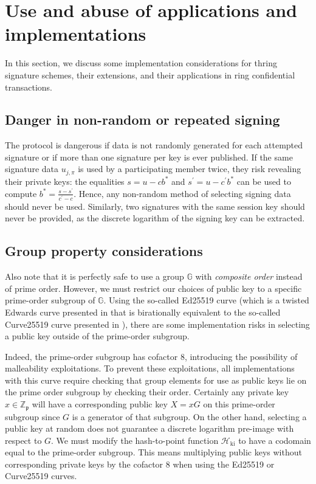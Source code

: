 \documentclass{mrl}
\theoremstyle{definition}
\numberwithin{theorem}{subsection}
\newcommand{\p}{\mathfrak{p}}
\begin{document}
\section{Use and abuse of applications and implementations}

In this section, we discuss some implementation considerations for thring signature schemes, their extensions, and their applications in ring confidential transactions. %



\subsection{Danger in non-random or repeated signing}


The protocol is dangerous if data is not randomly generated for each attempted signature or if more than one signature per key is ever published. If the same signature data $u_{j,\pi}$ is used by a participating member twice, they risk revealing their private keys: the equalities $s = u - c b^*$ and $s^\prime = u - c^\prime b^*$ can be used to compute $b^* = \frac{s-s^\prime}{c^\prime - c}$. Hence, any non-random method of selecting signing data should never be used. Similarly, two signatures with the same session key should never be provided, as the discrete logarithm of the signing key can be extracted.

\subsection{Group property considerations}

Also note that it is perfectly safe to use a group $\mathbb{G}$ with \textit{composite order} instead of prime order. However, we must restrict our choices of public key to a specific prime-order subgroup of $\mathbb{G}$. Using the so-called Ed25519 curve (which is a twisted Edwards curve presented in \cite{bernstein2012high} that is birationally equivalent to the so-called Curve25519 curve presented in \cite{bernstein2006curve25519}), there are some implementation risks in selecting a public key outside of the prime-order subgroup. 

Indeed, the prime-order subgroup has cofactor $8$, introducing the possibility of malleability exploitations. To prevent these exploitations, all implementations with this curve require checking that group elements for use as public keys lie on the prime order subgroup by checking their order. Certainly any private key $x \in \mathbb{Z}_\p$ will have a corresponding public key $X = xG$ on this prime-order subgroup since $G$ is a generator of that subgroup. On the other hand, selecting a public key at random does not guarantee a discrete logarithm pre-image with respect to $G$. We must modify the hash-to-point function $\mathcal{H}_{\text{ki}}$ to have a codomain equal to the prime-order subgroup. This means multiplying public keys without corresponding private keys by the cofactor $8$ when using the Ed25519 or Curve25519 curves.
\end{document}
